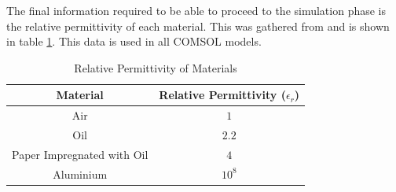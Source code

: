 

The final information required to be able to proceed to the simulation phase is the relative permittivity of each material.
This was gathered from \cite{Ahmed11} and is shown in table \ref{table:perm}.
This data is used in all COMSOL models.

\begin{table}[!htb]
\begin{center}
\begin{tabular}{cc}
\toprule
\textbf{Material} & \textbf{Relative Permittivity ($\epsilon_r$)} \\ \toprule
Air & $1$ \\
Oil &$ 2.2$ \\
Paper Impregnated with Oil &$ 4$ \\
Aluminium & $10^8$\\
\bottomrule
\end{tabular}
\end{center}
\caption{Relative Permittivity of Materials}
\label{table:perm}
\end{table}
